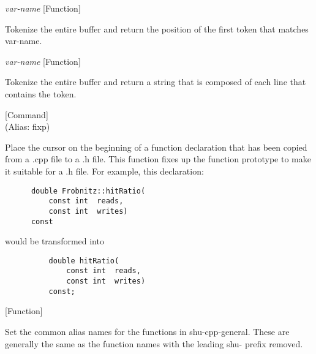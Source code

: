 \vspace{1em}
\noindent
{}
\usebox{\funcname}\emph{var-name}
 \hfill [Function]

\begin{doc-string}
Tokenize the entire buffer and return the position of the first token
that matches var-name.
\end{doc-string}

\vspace{1em}
\noindent
{}
\usebox{\funcname}\emph{var-name}
 \hfill [Function]

\begin{doc-string}
Tokenize the entire buffer and return a string that is composed of each
line that contains the token.
\end{doc-string}

\vspace{1em}
\noindent
{}
\usebox{\funcname}
 \hfill [Command]\\%
 (Alias: fixp)

\begin{doc-string}
Place the cursor on the beginning of a function declaration that has been
copied from a .cpp file to a .h file.  This function fixes up the function
prototype to make it suitable for a .h file.
For example, this declaration:

\small{\begin{verbatim}
      double Frobnitz::hitRatio(
          const int  reads,
          const int  writes)
      const
\end{verbatim}}

would be transformed into

\small{\begin{verbatim}
          double hitRatio(
              const int  reads,
              const int  writes)
          const;
\end{verbatim}}
\end{doc-string}

\vspace{1em}
\noindent
{}
\usebox{\funcname}
 \hfill [Function]

\begin{doc-string}
Set the common alias names for the functions in shu-cpp-general.
These are generally the same as the function names with the leading
shu- prefix removed.
\end{doc-string}

